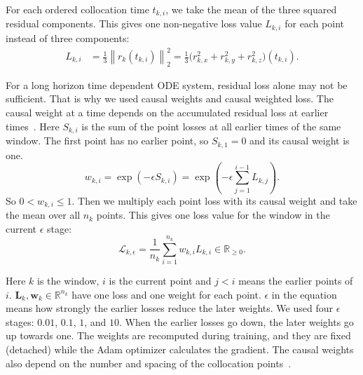 \documentclass[conference]{IEEEtran}
\begin{document}
For each ordered collocation time $t_{k,i}$, we take the mean of the three squared residual components. This gives one non-negative loss value $L_{k,i}$ for each point instead of three components:
\begin{equation}
\begin{aligned}
L_{k,i}
  &=\tfrac{1}{3}\left\|r_k(t_{k,i})\right\|_2^2=\tfrac{1}{3}\bigl(r_{k,x}^2+r_{k,y}^2+r_{k,z}^2\bigr)(t_{k,i}).
\end{aligned}
\label{eq:pointloss}
\end{equation}

For a long horizon time dependent ODE system, residual loss alone may not be sufficient. That is why we used causal weights and causal weighted loss. The causal weight at a time depends on the accumulated residual loss at earlier times~\cite{wang2024causal}. Here $S_{k,i}$ is the sum of the point losses at all earlier times of the same window. The first point has no earlier point, so $S_{k,1}=0$ and its causal weight is one.
\begin{equation}
w_{k,i}
=\exp\left(-\epsilon S_{k,i}\right)
=\exp\left(-\epsilon\sum_{j=1}^{i-1}L_{k,j}\right).
\label{eq:weights}
\end{equation}
So $0<w_{k,i}\leq1$. Then we multiply each point loss with its causal weight and take the mean over all $n_k$ points. This gives one loss value for the window in the current $\epsilon$ stage:
\begin{equation}
\mathcal{L}_{k,\epsilon}
=\frac{1}{n_k}
 \sum_{i=1}^{n_k}w_{k,i}L_{k,i}
\in\mathbb{R}_{\geq0}.
\label{eq:causalloss}
\end{equation}

Here $k$ is the window, $i$ is the current point and $j<i$ means the earlier points of $i$. $\mathbf{L}_k,\mathbf{w}_k\in\mathbb{R}^{n_k}$ have one loss and one weight for each point. $\epsilon$ in the equation means how strongly the earlier losses reduce the later weights. We used four $\epsilon$ stages: $0.01$, $0.1$, $1$, and $10$. When the earlier losses go down, the later weights go up towards one. The weights are recomputed during training, and they are fixed (detached) while the Adam optimizer calculates the gradient. The causal weights also depend on the number and spacing of the collocation points~\cite{wang2024causal}.
\end{document}
